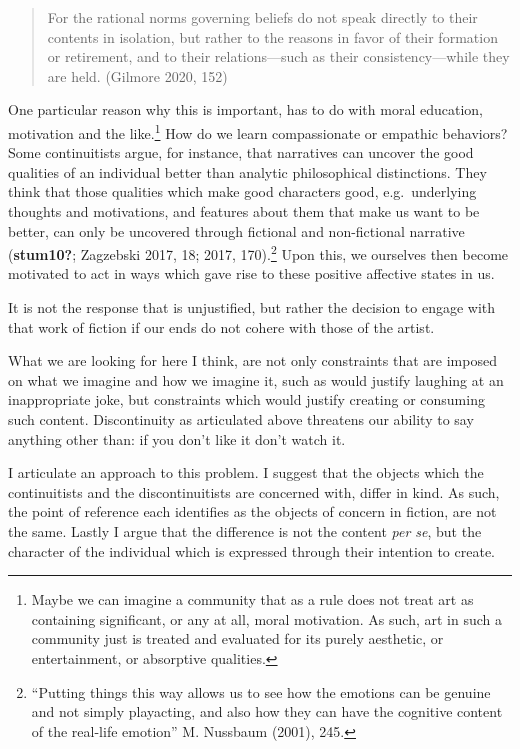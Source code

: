 \documentclass[12pt]{book}
\theoremstyle{definition}
\theoremstyle{remark}
\begin{document}
\begin{quote}
For the rational norms governing beliefs do not speak directly to their contents in isolation, but rather to the reasons in favor of their formation or retirement, and to their relations---such as their consistency---while they are held. (Gilmore 2020, 152)
\end{quote}

One particular reason why this is important, has to do with moral education, motivation and the like.\footnote{Maybe we can imagine a community that as a rule does not treat art as containing significant, or any at all, moral motivation. As such, art in such a community just is treated and evaluated for its purely aesthetic, or entertainment, or absorptive qualities.} How do we learn compassionate or empathic behaviors? Some continuitists argue, for instance, that narratives can uncover the good qualities of an individual better than analytic philosophical distinctions. They think that those qualities which make good characters good, e.g.~underlying thoughts and motivations, and features about them that make us want to be better, can only be uncovered through fictional and non-fictional narrative (\textbf{stum10?}; Zagzebski 2017, 18; 2017, 170).\footnote{``Putting things this way allows us to see how the emotions can be genuine and not simply playacting, and also how they can have the cognitive content of the real-life emotion'' M. Nussbaum (2001), 245.} Upon this, we ourselves then become motivated to act in ways which gave rise to these positive affective states in us.

It is not the response that is unjustified, but rather the decision to engage with that work of fiction if our ends do not cohere with those of the artist.

What we are looking for here I think, are not only constraints that are imposed on what we imagine and how we imagine it, such as would justify laughing at an inappropriate joke, but constraints which would justify creating or consuming such content. Discontinuity as articulated above threatens our ability to say anything other than: if you don't like it don't watch it.

I articulate an approach to this problem. I suggest that the objects which the continuitists and the discontinuitists are concerned with, differ in kind. As such, the point of reference each identifies as the objects of concern in fiction, are not the same. Lastly I argue that the difference is not the content \emph{per se}, but the character of the individual which is expressed through their intention to create.
\end{document}

